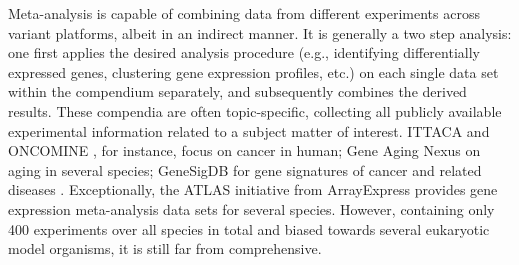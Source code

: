Meta-analysis is capable of combining data from different experiments across
variant platforms, albeit in an indirect manner.
%
It is generally a two step analysis: one first applies the desired analysis
procedure (e.g., identifying differentially expressed genes, clustering gene
expression profiles, etc.) on each single data set within the compendium
separately, and subsequently combines the derived results.
%
These compendia are often topic-specific, collecting all publicly available
experimental information related to a subject matter of interest.  ITTACA
\cite{Elfilali2006} and ONCOMINE \cite{Rhodes2007}, for instance, focus on
cancer in human; Gene Aging Nexus \cite{Pan2007} on aging in several species;
GeneSigDB for gene signatures of cancer and related diseases \cite{Culhane2012}.
%
Exceptionally, the ATLAS \cite{Kapushesky2010} initiative from ArrayExpress
provides gene expression meta-analysis data sets for several species.  However,
containing only 400 experiments over all species in total and biased towards
several eukaryotic model organisms, it is still far from comprehensive.




